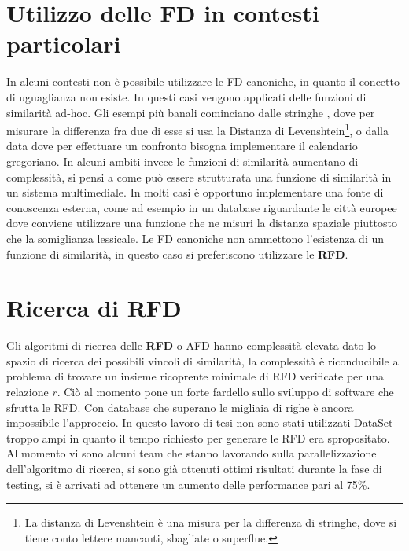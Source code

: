 \section{Utilizzo delle FD in contesti particolari}

In alcuni contesti non è possibile utilizzare le FD canoniche, in quanto il concetto di uguaglianza non esiste. In questi casi vengono applicati delle funzioni di similarità ad-hoc. Gli esempi più banali cominciano dalle stringhe , dove per misurare la differenza fra due di esse si usa la Distanza di Levenshtein\footnote{La distanza di Levenshtein è una misura per la differenza di stringhe, dove si tiene conto lettere mancanti, sbagliate o superflue.}, o dalla data  dove per effettuare un confronto bisogna implementare il calendario gregoriano. In alcuni ambiti invece le funzioni di similarità aumentano di complessità, si pensi a come può essere strutturata una funzione di similarità in un sistema multimediale. In molti casi è opportuno implementare una fonte di conoscenza esterna, come ad esempio in un database riguardante le città europee dove conviene utilizzare una funzione che ne misuri la distanza spaziale piuttosto che la somiglianza lessicale. Le FD canoniche non ammettono l'esistenza di un funzione di similarità, in questo caso si preferiscono utilizzare le \textbf{RFD}.

\section{Ricerca di RFD}
Gli algoritmi di ricerca delle \textbf{RFD} o AFD hanno complessità elevata dato lo spazio di ricerca dei possibili vincoli di similarità, la complessità è riconducibile al problema di trovare un insieme ricoprente minimale di RFD verificate per una relazione $r$. Ciò al momento pone un forte fardello sullo sviluppo di software che sfrutta le RFD. Con database che superano le migliaia di righe è ancora impossibile l’approccio. In questo lavoro di tesi non sono stati utilizzati DataSet troppo ampi in quanto il tempo richiesto per generare le RFD era spropositato. Al momento vi sono alcuni team che stanno lavorando sulla parallelizzazione dell'algoritmo di ricerca, si sono già ottenuti ottimi risultati durante la fase di testing, si è arrivati ad ottenere un aumento delle performance pari al 75\%.


